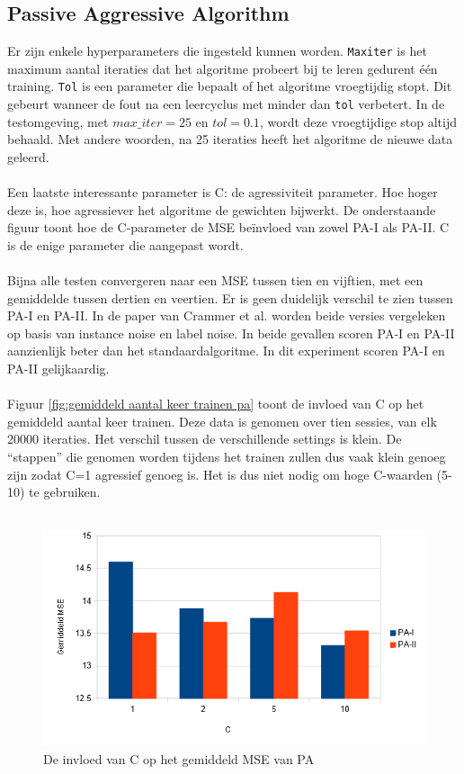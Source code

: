 \subsection{Passive Aggressive Algorithm}
Er zijn enkele hyperparameters die ingesteld kunnen worden. \texttt{Max\textunderscore iter} is het maximum aantal iteraties dat het algoritme probeert bij te leren gedurent één training. \texttt{Tol} is een parameter die bepaalt of het algoritme vroegtijdig stopt. Dit gebeurt wanneer de fout na een leercyclus met minder dan \texttt{tol} verbetert. In de testomgeving, met $max\_ iter=25$ en $tol=0.1$, wordt deze vroegtijdige stop altijd behaald. Met andere woorden, na 25 iteraties heeft het algoritme de nieuwe data geleerd.
\\\\
Een laatste interessante parameter is C: de agressiviteit parameter. Hoe hoger deze is, hoe agressiever het algoritme de gewichten bijwerkt. De onderstaande figuur toont hoe de C-parameter de MSE beïnvloed van zowel PA-I als PA-II. C is de enige parameter die aangepast wordt.
\\\\
Bijna alle testen convergeren naar een MSE tussen tien en vijftien, met een gemiddelde tussen dertien en veertien. Er is geen duidelijk verschil te zien tussen PA-I en PA-II. In de paper van Crammer et al. \cite{pa algorithm} worden beide versies vergeleken op basis van instance noise en label noise. In beide gevallen scoren PA-I en PA-II aanzienlijk beter dan het standaardalgoritme. In dit experiment scoren PA-I en PA-II gelijkaardig.
\\\\
Figuur \ref{fig:gemiddeld aantal keer trainen pa} toont de invloed van C op het gemiddeld aantal keer trainen. Deze data is genomen over tien sessies, van elk 20000 iteraties. Het verschil tussen de verschillende settings is klein. De “stappen” die genomen worden tijdens het trainen zullen dus vaak klein genoeg zijn zodat C=1 agressief genoeg is. Het is dus niet nodig om hoge C-waarden (5-10) te gebruiken.
\\\\
\begin{figure}[h]
	\includegraphics[width=\linewidth]{images/evaluatie/gemiddeldmsepa.png}
	\caption{De invloed van C op het gemiddeld MSE van PA}
	\label{fig:invloed C op PA}
\end{figure}

